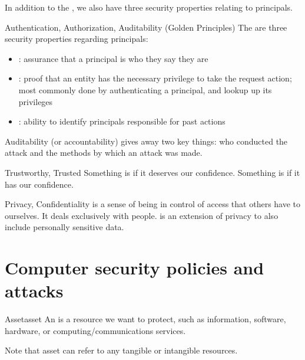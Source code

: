 \documentclass[12pt]{report}
\begin{document}
In addition to the , we also have three security properties relating to principals.
\begin{dfnbox}{Authentication, Authorization, Auditability (Golden Principles)}{}
    The  are three security properties regarding principals:

    \begin{itemize}[noitemsep]
        \item {}: assurance that a principal is who they say they are
        \item {}: proof that an entity has the necessary privilege to take the request action; most commonly done by authenticating a principal, and lookup up its privileges
        \item {}: ability to identify principals responsible for past actions
    \end{itemize}

\end{dfnbox}

Auditability (or accountability) gives away two key things: who conducted the attack and the methods by which an attack was made.

\begin{dfnbox}{Trustworthy, Trusted}{}
    Something is  if it deserves our confidence.     Something is  if it has our confidence.

\end{dfnbox}

\begin{dfnbox}{Privacy, Confidentiality}{}
     is a sense of being in control of access that others have to ourselves. It deals exclusively with people.  is an extension of privacy to also include personally sensitive data.
\end{dfnbox}

\section{Computer security policies and attacks}

\begin{dfnbox}{Asset}{asset}
    An  is a resource we want to protect, such as information, software, hardware, or computing/communications services.
\end{dfnbox}

Note that asset can refer to any tangible or intangible resources.
\end{document}
